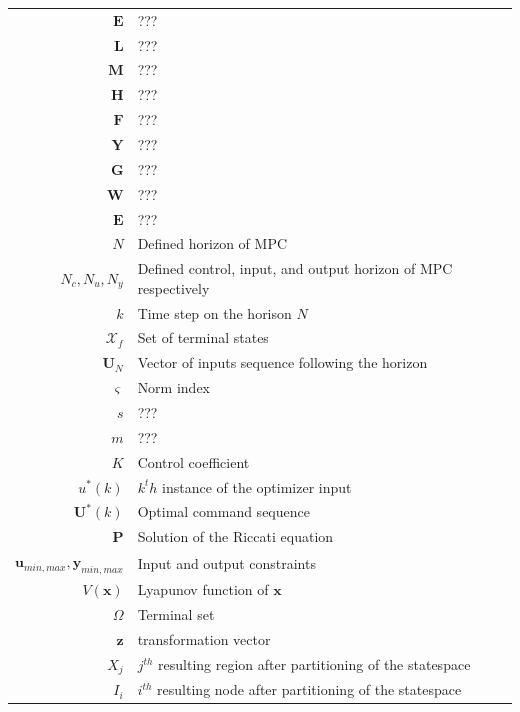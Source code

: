 \begin{tabularx}{\textwidth}{r|l}
	$\textbf{E}$																&???\\
	$\textbf{L}$																&???\\
	$\textbf{M}$																&???\\
	$\textbf{H}$																&???\\
	$\textbf{F}$																&???\\
	$\textbf{Y}$																&???\\
	$\textbf{G}$																&???\\
	$\textbf{W}$																&???\\
	$\textbf{E}$																&???\\
	$N$											& Defined horizon of MPC\\
	$N_c,N_u,N_y$											& Defined control, input, and output horizon of MPC respectively\\
	$k$																& Time step on the horison $N$ \\
	$\mathcal{X}_f$															& Set of terminal states \\
	$\textbf{U}_N$										& Vector of inputs sequence following the horizon\\
	$\varsigma$											& Norm index\\
	$s$																& ???\\
	$m$																& ???\\
	$K$															& Control coefficient \\
	$u^*(k)$													& $k^th$ instance of the optimizer input\\
	$\textbf{U}^*(k)$									& Optimal command sequence\\
	$\textbf{P}$																& Solution of the Riccati equation\\
	$\textbf{u}_{min,max},\textbf{y}_{min,max}$					& Input and output constraints\\
	$V(\textbf{x})$														& Lyapunov function of $\textbf{x}$\\
	$\Omega$ 													& Terminal set\\
	$\textbf{z}$																& transformation vector\\
	$X_j$															& $j^{th}$ resulting region after partitioning of the statespace\\
	$I_i$															& $i^{th}$ resulting node after partitioning of the statespace\\
	
\end{tabularx}

%

